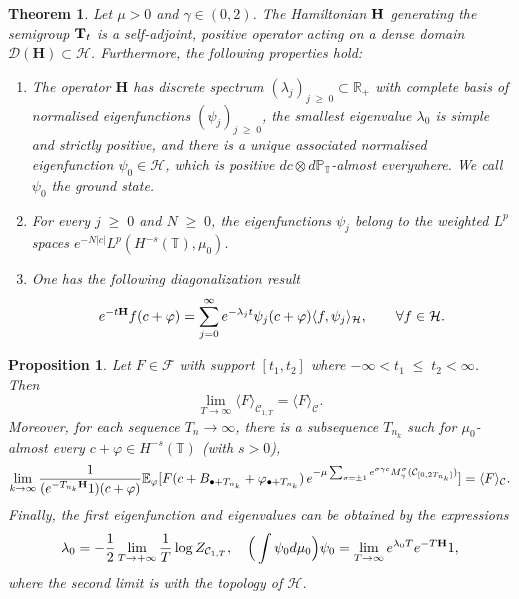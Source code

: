 \documentclass[10pt,a4paper]{amsart}
\newtheorem{theorem}{Theorem}
\newtheorem{proposition}{Proposition}
\def\E{\mathbb{E}}
\newcommand{\R}{\mathbb{R}}
\def\T{\mathbb{T}}
\newcommand{\cjd}{\rangle}
\newcommand{\cjg}{\langle}
\renewcommand{\geq}{\;\geqslant\;}                   %
\newcommand{\la}{\lambda}
\renewcommand{\leq}{\;\leqslant\;}                   %
\newcommand{\mc}{\mathcal}
\begin{document}
\begin{theorem}\label{thm:spectrum_H}
Let $\mu > 0$ and $\gamma\in(0,2)$. The Hamiltonian ${\bf H}$ generating the semigroup ${\bf T}_t$ is a self-adjoint, positive operator acting on a dense domain $\mathcal{D}(\mathbf{H}) \subset \mathcal{H}$. Furthermore, the following properties hold:
\begin{enumerate}
\item The operator $\mathbf{H}$ has discrete spectrum $(\lambda_j)_{j \geq 0}\subset \R_+$  with complete basis of normalised eigenfunctions $(\psi_j)_{j \geq 0}$,  the smallest eigenvalue $\lambda_0$ is simple and strictly positive, and there is  a unique associated normalised eigenfunction $\psi_0\in \mc{H}$, which is positive $dc\otimes d\mathbb P_\T$-almost everywhere. We call $\psi_0$ the ground state.
\item For every $j \geq 0$ and $N \geq 0$, the eigenfunctions $\psi_j$ belong to the weighted $L^p$ spaces $e^{-N|c|}L^p(H^{-s}(\T),\mu_0)$.
\item  One has the following diagonalization result
\begin{equation}\label{introdiagonalize}
e^{-t{\bf H}}f(c+\varphi)= \sum_{j=0}^{\infty} e^{-\lambda_j t}\psi_j(c+\varphi)
\langle f, \psi_j \rangle_{\mc{H}}, \qquad \forall f \in \mathcal{H}.
\end{equation}
\end{enumerate}
\end{theorem}

\begin{proposition} \label{prop: sinh expectation}
Let $F \in \mathcal{F}$ with support $[t_1,t_2]$ where $-\infty < t_1 \leq t_2 < \infty$. Then 
\[\lim_{T\to \infty} \langle F \rangle_{\mc{C}_{1,T}}
=\cjg F\cjd_{\mc{C}}.\]
Moreover,  for each sequence $T_n\to \infty$, there is a subsequence $T_{n_k}$ such for $\mu_0$-almost every $c+\varphi\in H^{-s}(\T)$ (with $s>0$),
\begin{equation}\label{ae_convergence}
\lim_{k\to \infty} \frac{1}{(e^{-T_{n_k}{\bf H}}1)(c+\varphi)}  \E_\varphi[F (c+B_{\bullet+T_{n_k}}+\varphi_{\bullet+T_{n_k}}) \,   e^{- \mu\sum_{\sigma = \pm 1} 
e^{\sigma\gamma c} M_\gamma^\sigma(\mc{C}_{[0,2T_{n_k}]})}]
=\cjg F\cjd_{\mc{C}}.	
\end{equation}
Finally, the first eigenfunction and eigenvalues can be obtained by the expressions 
\[ \la_0=-\frac{1}{2}\lim_{T\to +\infty}\frac{1}{T}\log Z_{\mc{C}_{1,T}}, \quad \Big(\int \psi_0d\mu_0\Big) \psi_0= \lim_{T\to \infty}e^{\la_0T}e^{-T{\bf H}}1,\]
where the second limit is with the topology of $\mc{H}$.
\end{proposition}
\end{document}
